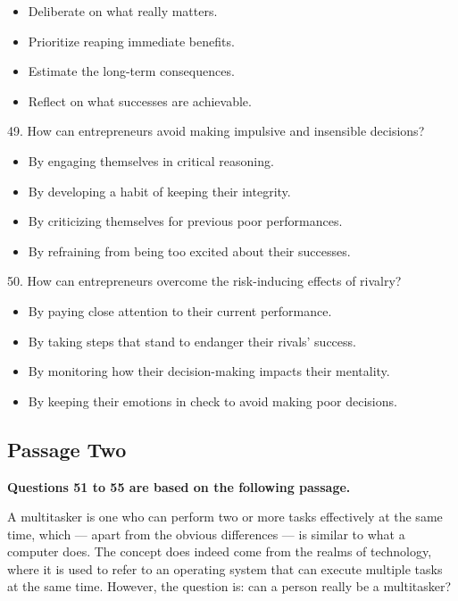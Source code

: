 \documentclass[UTF8,11pt]{ctexart}
\begin{document}
\begin{itemize}[leftmargin=2em,itemsep=.2em,topsep=.4em]\item[A.] Deliberate on what really matters.
\item[B.] Prioritize reaping immediate benefits.
\item[C.] Estimate the long-term consequences.
\item[D.] Reflect on what successes are achievable.
\end{itemize}

49. How can entrepreneurs avoid making impulsive and insensible decisions?


\begin{itemize}[leftmargin=2em,itemsep=.2em,topsep=.4em]\item[A.] By engaging themselves in critical reasoning.
\item[B.] By developing a habit of keeping their integrity.
\item[C.] By criticizing themselves for previous poor performances.
\item[D.] By refraining from being too excited about their successes.
\end{itemize}

50. How can entrepreneurs overcome the risk-inducing effects of rivalry?


\begin{itemize}[leftmargin=2em,itemsep=.2em,topsep=.4em]\item[A.] By paying close attention to their current performance.
\item[B.] By taking steps that stand to endanger their rivals’ success.
\item[C.] By monitoring how their decision-making impacts their mentality.
\item[D.] By keeping their emotions in check to avoid making poor decisions.
\end{itemize}

\subsection*{\textbf{Passage Two}}


\textbf{Questions 51 to 55 are based on the following passage.}


A multitasker is one who can perform two or more tasks effectively at the same time, which — apart from the obvious differences — is similar to what a computer does. The concept does indeed come from the realms of technology, where it is used to refer to an operating system that can execute multiple tasks at the same time. However, the question is: can a person really be a multitasker?
\end{document}
